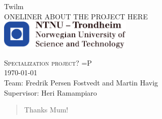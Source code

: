 \documentclass[10pt,a4paper,oneside]{report}
\begin{document}
\thispagestyle{empty}
\begin{center}
	{\Huge Twilm} \\
	\medskip
	{\LARGE ONELINER ABOUT THE PROJECT HERE} \\
	\includegraphics[width=2.5in]{image/logo-ntnu.pdf} \\
\end{center}
{\Large \textsc{Specialization project? =P}} \\
{\large \today \\Team: Fredrik Persen Fostvedt and Martin Havig}
{\large \\Supervisor: Heri Ramampiaro}
\newpage

\renewcommand{\abstractname}{Acknowledgements}
\begin{abstract}
 Thanks Mum!
\end{abstract}
\end{document}
